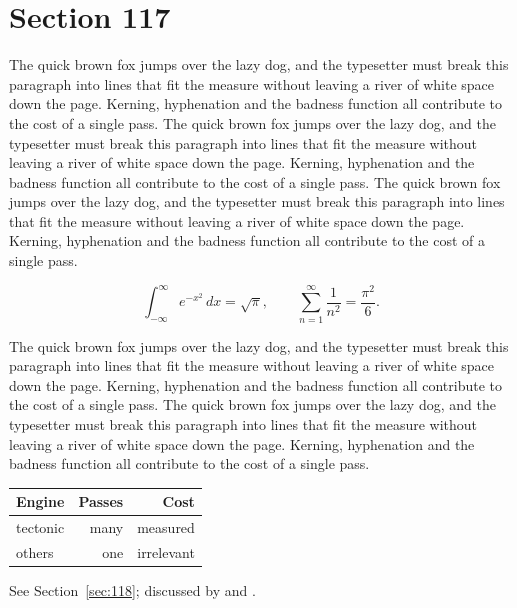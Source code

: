 \documentclass{article}
\begin{document}
\section{Section 117}
\label{sec:117}
The quick brown fox jumps over the lazy dog, and the typesetter must break this paragraph into lines that fit the measure without leaving a river of white space down the page. Kerning, hyphenation and the badness function all contribute to the cost of a single pass. The quick brown fox jumps over the lazy dog, and the typesetter must break this paragraph into lines that fit the measure without leaving a river of white space down the page. Kerning, hyphenation and the badness function all contribute to the cost of a single pass. The quick brown fox jumps over the lazy dog, and the typesetter must break this paragraph into lines that fit the measure without leaving a river of white space down the page. Kerning, hyphenation and the badness function all contribute to the cost of a single pass. 

\begin{equation}\label{eq:117}
\int_{-\infty}^{\infty} e^{-x^{2}}\,dx = \sqrt{\pi}, \qquad
\sum_{n=1}^{\infty} \frac{1}{n^{2}} = \frac{\pi^{2}}{6}.
\end{equation}

The quick brown fox jumps over the lazy dog, and the typesetter must break this paragraph into lines that fit the measure without leaving a river of white space down the page. Kerning, hyphenation and the badness function all contribute to the cost of a single pass. The quick brown fox jumps over the lazy dog, and the typesetter must break this paragraph into lines that fit the measure without leaving a river of white space down the page. Kerning, hyphenation and the badness function all contribute to the cost of a single pass. 

\begin{center}
\begin{tabular}{lrr}
\toprule
Engine & Passes & Cost \\
\midrule
tectonic & many & measured \\
others & one & irrelevant \\
\bottomrule
\end{tabular}
\end{center}

See Section~\ref{sec:118}; discussed by \textcite{k3} and \textcite{l5}.
\end{document}
